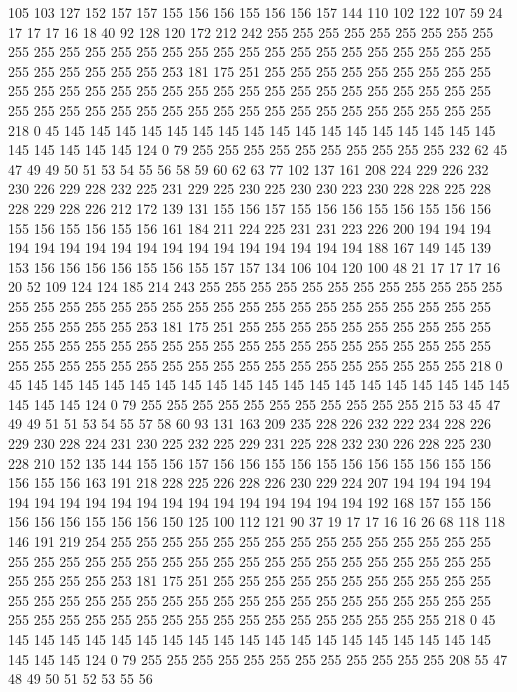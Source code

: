 105 103 127 152 157 157 155 156 156 155 156 156 157 144 110 102 122 107 59 24
17 17 17 16 18 40 92 128 120 172 212 242 255 255 255 255 255 255 255 255
255 255 255 255 255 255 255 255 255 255 255 255 255 255 255 255 255 255 255 255
255 255 255 255 255 255 253 181 175 251 255 255 255 255 255 255 255 255 255 255
255 255 255 255 255 255 255 255 255 255 255 255 255 255 255 255 255 255 255 255
255 255 255 255 255 255 255 255 255 255 255 255 255 255 255 255 255 218 0 45
145 145 145 145 145 145 145 145 145 145 145 145 145 145 145 145 145 145 145 145
145 145 124 0 79 255 255 255 255 255 255 255 255 255 255 232 62 45 47 49
49 50 51 53 54 55 56 58 59 60 62 63 77 102 137 161 208 224 229 226
232 230 226 229 228 232 225 231 229 225 230 225 230 230 223 230 228 228 225 228
228 229 228 226 212 172 139 131 155 156 157 155 156 156 155 156 155 156 156 155
156 155 156 155 156 161 184 211 224 225 231 231 223 226 200 194 194 194 194 194
194 194 194 194 194 194 194 194 194 194 194 194 188 167 149 145 139 153 156 156
156 156 155 156 155 157 157 134 106 104 120 100 48 21 17 17 17 16 20 52
109 124 124 185 214 243 255 255 255 255 255 255 255 255 255 255 255 255 255 255
255 255 255 255 255 255 255 255 255 255 255 255 255 255 255 255 255 255 255 255
255 255 253 181 175 251 255 255 255 255 255 255 255 255 255 255 255 255 255 255
255 255 255 255 255 255 255 255 255 255 255 255 255 255 255 255 255 255 255 255
255 255 255 255 255 255 255 255 255 255 255 255 255 218 0 45 145 145 145 145
145 145 145 145 145 145 145 145 145 145 145 145 145 145 145 145 145 145 124 0
79 255 255 255 255 255 255 255 255 255 255 255 215 53 45 47 49 49 51 51
53 54 55 57 58 60 93 131 163 209 235 228 226 232 222 234 228 226 229 230
228 224 231 230 225 232 225 229 231 225 228 232 230 226 228 225 230 228 210 152
135 144 155 156 157 156 156 155 156 155 156 156 155 156 155 156 156 155 156 163
191 218 228 225 226 228 226 230 229 224 207 194 194 194 194 194 194 194 194 194
194 194 194 194 194 194 194 194 194 192 168 157 155 156 156 156 156 155 156 156
150 125 100 112 121 90 37 19 17 17 16 16 26 68 118 118 146 191 219 254
255 255 255 255 255 255 255 255 255 255 255 255 255 255 255 255 255 255 255 255
255 255 255 255 255 255 255 255 255 255 255 255 255 255 255 255 255 255 253 181
175 251 255 255 255 255 255 255 255 255 255 255 255 255 255 255 255 255 255 255
255 255 255 255 255 255 255 255 255 255 255 255 255 255 255 255 255 255 255 255
255 255 255 255 255 255 255 255 255 218 0 45 145 145 145 145 145 145 145 145
145 145 145 145 145 145 145 145 145 145 145 145 145 145 124 0 79 255 255 255
255 255 255 255 255 255 255 255 255 208 55 47 48 49 50 51 52 53 55 56
